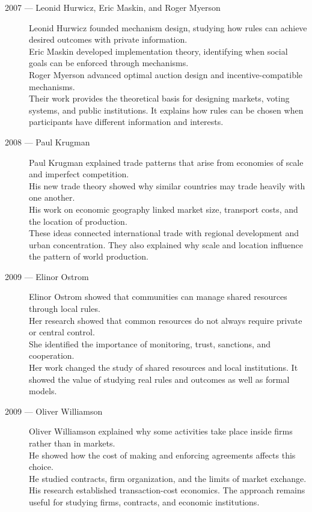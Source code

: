 \documentclass[12pt]{report}
\begin{document}
{\begin{description}
\item[2007 --- Leonid Hurwicz, Eric Maskin, and Roger Myerson]
Leonid Hurwicz founded mechanism design, studying how rules can achieve desired outcomes with private information.\\
Eric Maskin developed implementation theory, identifying when social goals can be enforced through mechanisms.\\
Roger Myerson advanced optimal auction design and incentive-compatible mechanisms.\\
Their work provides the theoretical basis for designing markets, voting systems, and public institutions. It explains how rules can be chosen when participants have different information and interests.

\item[2008 --- Paul Krugman]
Paul Krugman explained trade patterns that arise from economies of scale and imperfect competition.\\
His new trade theory showed why similar countries may trade heavily with one another.\\
His work on economic geography linked market size, transport costs, and the location of production.\\
These ideas connected international trade with regional development and urban concentration. They also explained why scale and location influence the pattern of world production.

\item[2009 --- Elinor Ostrom]
Elinor Ostrom showed that communities can manage shared resources through local rules.\\
Her research showed that common resources do not always require private or central control.\\
She identified the importance of monitoring, trust, sanctions, and cooperation.\\
Her work changed the study of shared resources and local institutions. It showed the value of studying real rules and outcomes as well as formal models.

\item[2009 --- Oliver Williamson]
Oliver Williamson explained why some activities take place inside firms rather than in markets.\\
He showed how the cost of making and enforcing agreements affects this choice.\\
He studied contracts, firm organization, and the limits of market exchange.\\
His research established transaction-cost economics. The approach remains useful for studying firms, contracts, and economic institutions.


\end{description}}
\end{document}
